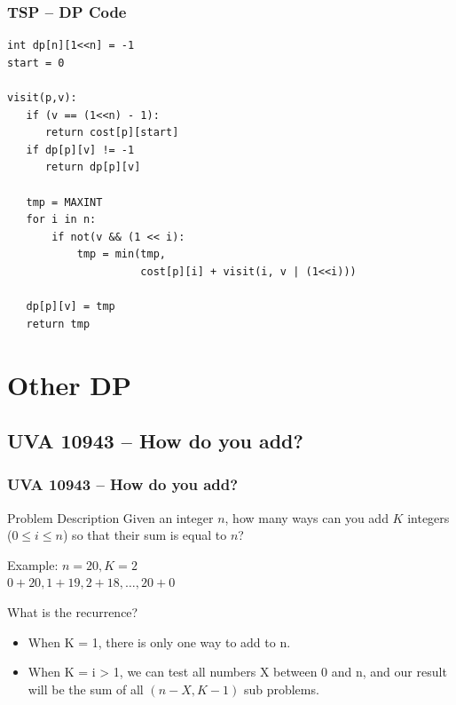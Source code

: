\documentclass{beamer}
\begin{document}
\begin{frame}
  \frametitle{TSP -- DP Code}

{\smaller
  \begin{exampleblock}{}
\begin{verbatim}
int dp[n][1<<n] = -1
start = 0

visit(p,v):
   if (v == (1<<n) - 1):
      return cost[p][start]
   if dp[p][v] != -1
      return dp[p][v]

   tmp = MAXINT
   for i in n:
       if not(v && (1 << i):
           tmp = min(tmp,
                     cost[p][i] + visit(i, v | (1<<i)))

   dp[p][v] = tmp
   return tmp

\end{verbatim}
  \end{exampleblock}}
\end{frame}

\section{Other DP}

\subsection{UVA 10943 -- How do you add?}
\begin{frame}
  \frametitle{UVA 10943 -- How do you add?}
  \begin{block}{Problem Description}
    Given an integer $n$, how many ways can you add $K$ integers ($0 \leq
    i \leq n$) so that their sum is equal to $n$?
 
    \bigskip

    Example: $n = 20, K = 2$\\
    $0 + 20, 1 + 19, 2 + 18, \ldots, 20+0$ 
  \end{block}

  What is the recurrence?

  \begin{itemize}
  \item When K = 1, there is only one way to add to n.
  \item When K = i > 1, we can test all numbers X between 0 and n, and
    our result will be the sum of all $(n-X,K-1)$ sub problems.\\
  \end{itemize}
\end{frame}
\end{document}

